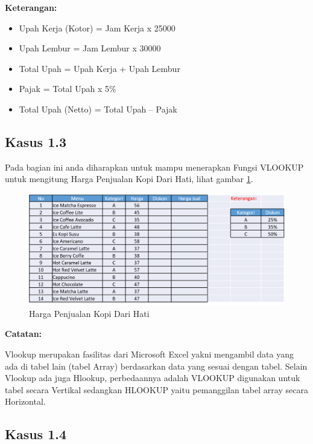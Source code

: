 \documentclass[
]{book}
\providecommand{\tightlist}{%
  \setlength{\itemsep}{0pt}\setlength{\parskip}{0pt}}
\begin{document}
\textbf{Keterangan:}

\begin{itemize}
\tightlist
\item
  Upah Kerja (Kotor) = Jam Kerja x 25000
\item
  Upah Lembur = Jam Lembur x 30000
\item
  Total Upah = Upah Kerja + Upah Lembur
\item
  Pajak = Total Upah x 5\%
\item
  Total Upah (Netto) = Total Upah -- Pajak
\end{itemize}

\hypertarget{kasus-1.3}{%
\subsection*{Kasus 1.3}\label{kasus-1.3}}

Pada bagian ini anda diharapkan untuk mampu menerapkan Fungsi VLOOKUP untuk mengitung Harga Penjualan Kopi Dari Hati, lihat gambar \ref{fig:tabel3}.

\begin{figure}

{\centering \includegraphics[width=1\linewidth]{images/tabel3} 

}

\caption{Harga Penjualan Kopi Dari Hati}\label{fig:tabel3}
\end{figure}

\textbf{Catatan:}

Vlookup merupakan fasilitas dari Microsoft Excel yakni mengambil data yang ada di tabel lain (tabel Array) berdasarkan data yang sesuai dengan tabel. Selain Vlookup ada juga Hlookup, perbedaannya adalah VLOOKUP digunakan untuk tabel secara Vertikal sedangkan HLOOKUP yaitu pemanggilan tabel array secara Horizontal.

\hypertarget{kasus-1.4}{%
\subsection*{Kasus 1.4}\label{kasus-1.4}}
\end{document}
